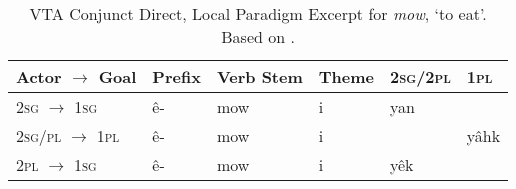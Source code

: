 \begin{table}[h]
  \centering
\begin{tabular}{llllll}
    \toprule
Actor $\rightarrow$   Goal                                                                               & Prefix & Verb Stem & Theme & 2\textsc{sg}/2\textsc{pl} & 1\textsc{pl} \\    
\midrule
2\textsc{sg} $\rightarrow$   1\textsc{sg}                              & ê-     & mow          & i     & yan                                                         &                               \\
2\textsc{sg}/\textsc{pl} $\rightarrow$   1\textsc{pl}                  & ê-     & mow          & i     &                     & yâhk                          \\
2\textsc{pl} $\rightarrow$   1\textsc{sg}                              & ê-     & mow          & i     & yêk                                                         &                               \\
    \bottomrule
  \end{tabular}
  \caption{
    VTA Conjunct Direct, Local Paradigm Excerpt for \textit{mow}, `to eat'. Based on \citet[419]{Wolvengrey2011}. \label{tab:vtacnjdir}
  }
\end{table}


